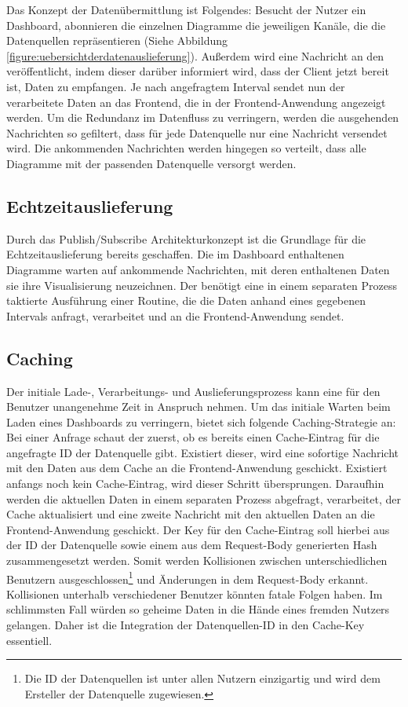 Das Konzept der Datenübermittlung ist Folgendes: Besucht der Nutzer ein Dashboard,
abonnieren die einzelnen Diagramme die jeweiligen Kanäle, die die Datenquellen 
repräsentieren (Siehe Abbildung \ref{figure:uebersichtderdatenauslieferung}).
Außerdem wird eine Nachricht an den  veröffentlicht,
indem dieser darüber informiert wird, dass der Client jetzt bereit ist, Daten zu empfangen.
Je nach angefragtem Interval sendet nun der  verarbeitete
Daten an das Frontend, die in der Frontend-Anwendung angezeigt werden. Um die
Redundanz im Datenfluss zu verringern, werden die ausgehenden Nachrichten
so gefiltert, dass für jede Datenquelle nur eine Nachricht versendet wird. Die ankommenden
Nachrichten werden hingegen so verteilt, dass alle Diagramme mit der passenden Datenquelle
versorgt werden.

\subsection{Echtzeitauslieferung}
\label{subsec:echtzeitauslieferung}
Durch das Publish/Subscribe Architekturkonzept ist die Grundlage für die Echtzeitauslieferung
bereits geschaffen. Die im Dashboard enthaltenen Diagramme warten auf ankommende Nachrichten,
mit deren enthaltenen Daten sie ihre Visualisierung neuzeichnen. Der 
benötigt eine in einem separaten Prozess taktierte Ausführung einer Routine, die die Daten
anhand eines gegebenen Intervals anfragt, verarbeitet und an die Frontend-Anwendung sendet.

\subsection{Caching}
\label{subsec:caching}
Der initiale Lade-, Verarbeitungs- und Auslieferungsprozess kann eine für den Benutzer
unangenehme Zeit in Anspruch nehmen. Um das initiale Warten beim Laden eines Dashboards
zu verringern, bietet sich folgende Caching-Strategie an: Bei einer Anfrage schaut
der  zuerst, ob es bereits einen Cache-Eintrag für die
angefragte ID der Datenquelle gibt. Existiert dieser, wird eine sofortige Nachricht
mit den Daten aus dem Cache an die Frontend-Anwendung geschickt. Existiert anfangs noch
kein Cache-Eintrag, wird dieser Schritt übersprungen. Daraufhin werden
die aktuellen Daten in einem separaten Prozess abgefragt, verarbeitet, der Cache
aktualisiert und eine zweite Nachricht mit den aktuellen Daten an die Frontend-Anwendung
geschickt. Der Key für den Cache-Eintrag soll hierbei aus der ID der Datenquelle sowie
einem aus dem Request-Body generierten Hash zusammengesetzt werden. Somit werden
Kollisionen zwischen unterschiedlichen Benutzern ausgeschlossen\footnote{Die ID der Datenquellen ist
unter allen Nutzern einzigartig und wird dem Ersteller der Datenquelle zugewiesen.}
und Änderungen in dem Request-Body erkannt. Kollisionen unterhalb verschiedener
Benutzer könnten fatale Folgen haben. Im schlimmsten Fall würden so geheime Daten
in die Hände eines fremden Nutzers gelangen. Daher ist die Integration der Datenquellen-ID
in den Cache-Key essentiell.

